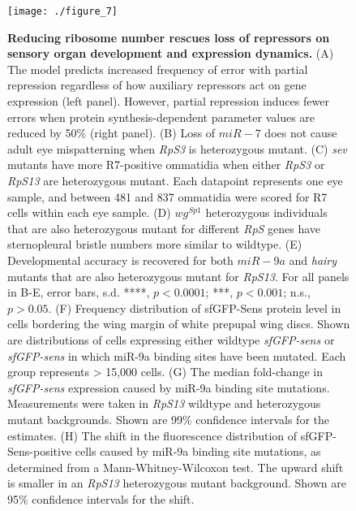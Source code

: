 \begin{figure}[h!]
\label{fig:metabolism:fig7}
\centering
\texttt{[image: ./figure\_7]}
\caption[Reducing ribosome number rescues loss of repressors on sensory organ development and expression dynamics.]{\textbf{Reducing ribosome number rescues loss of repressors on sensory organ development and expression dynamics.} (A) The model predicts increased frequency of error with partial repression regardless of how auxiliary repressors act on gene expression (left panel). However, partial repression induces fewer errors when protein synthesis-dependent parameter values are reduced by 50\% (right panel). (B) Loss of $miR-7$ does not cause adult eye mispatterning when \textit{RpS3} is heterozygous mutant. (C) \textit{sev} mutants have more R7-positive ommatidia when either \textit{RpS3} or \textit{RpS13} are heterozygous mutant. Each datapoint represents one eye sample, and between 481 and 837 ommatidia were scored for R7 cells within each eye sample. (D) $wg^{Sp1}$ heterozygous individuals that are also heterozygous mutant for different \textit{RpS} genes have sternopleural bristle numbers more similar to wildtype. (E) Developmental accuracy is recovered for both $miR-9a$ and \textit{hairy} mutants that are also heterozygous mutant for \textit{RpS13}. For all panels in B-E, error bars, s.d. ****, $p<0.0001$; ***, $p<0.001$; n.s., $p>0.05$. (F) Frequency distribution of sfGFP-Sens protein level in cells bordering the wing margin of white prepupal wing discs. Shown are distributions of cells expressing either wildtype \textit{sfGFP-sens} or \textit{sfGFP-sens} in which miR-9a binding sites have been mutated. Each group represents \textgreater{} 15,000 cells. (G) The median fold-change in \textit{sfGFP-sens} expression caused by miR-9a binding site mutations. Measurements were taken in \textit{RpS13} wildtype and heterozygous mutant backgrounds. Shown are 99\% confidence intervals for the estimates. (H) The shift in the fluorescence distribution of sfGFP-Sens-positive cells caused by miR-9a binding site mutations, as determined from a Mann-Whitney-Wilcoxon test. The upward shift is smaller in an \textit{RpS13} heterozygous mutant background. Shown are 95\% confidence intervals for the shift.}
\end{figure}

